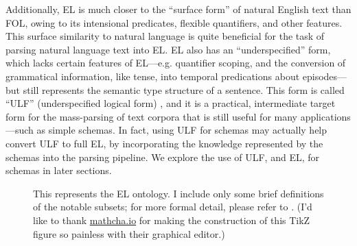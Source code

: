 Additionally, EL is much closer to the ``surface form'' of natural English text than FOL, owing to its intensional predicates, flexible quantifiers, and other features. This surface similarity to natural language is quite beneficial for the task of parsing natural language text into EL. EL also has an ``underspecified'' form, which lacks certain features of EL---e.g. quantifier scoping, and the conversion of grammatical information, like tense, into temporal predications about episodes---but still represents the semantic type structure of a sentence. This form is called ``ULF'' (underspecified logical form) \citep{kim2019type}, and it is a practical, intermediate target form for the mass-parsing of text corpora that is still useful for many applications---such as simple schemas. In fact, using ULF for schemas may actually help convert ULF to full EL, by incorporating the knowledge represented by the schemas into the parsing pipeline. We explore the use of ULF, and EL, for schemas in later sections.

\begin{figure}
    

    \caption{This represents the EL ontology. I include only some brief definitions of the notable subsets; for more formal detail, please refer to \citep{schubert2000episodic}. \tiny{(I'd like to thank \href{https://www.mathcha.io}{mathcha.io} for making the construction of this TikZ figure so painless with their graphical editor.)}}
    \label{fig:el_ontology}
\end{figure}